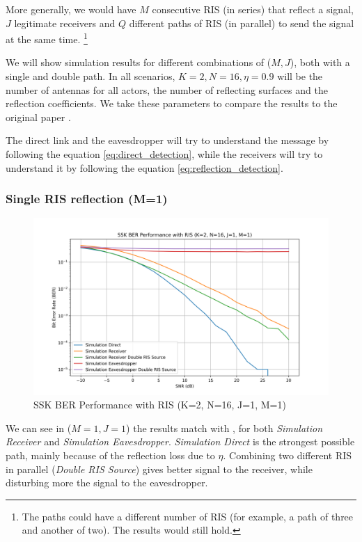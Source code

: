 More generally, we would have $M$ consecutive RIS (in series) that reflect a signal, $J$ legitimate receivers and $Q$ different paths of RIS (in parallel) to send the signal at the same time. \footnote{The paths could have a different number of RIS (for example, a path of three and another of two). The results would still hold.}

We will show simulation results for different combinations of ($M, J$), both with a single and double path. In all scenarios, $K = 2, N = 16, \eta = 0.9$ will be the number of antennas for all actors, the number of reflecting surfaces and the reflection coefficients. We take these parameters to compare the results to the original paper \cite{9328149}.

The direct link and the eavesdropper will try to understand the message by following the equation \eqref{eq:direct_detection}, while the receivers will try to understand it by following the equation \eqref{eq:reflection_detection}.

\subsubsection{Single RIS reflection (M=1)}

\begin{figure}[H]
  \centering
  \includegraphics[width=0.9\linewidth]{imgs/ber-simulations/SSK BER Performance with RIS (K=2, N=16, J=1, M=1).png}
  \caption{SSK BER Performance with RIS (K=2, N=16, J=1, M=1)}
  \label{fig:simulation_j1_m1}
\end{figure}

We can see in ($M=1, J=1$) the results match with \cite{9328149}, for both \textit{Simulation Receiver} and \textit{Simulation Eavesdropper}.
\textit{Simulation Direct} is the strongest possible path, mainly because of the reflection loss due to $\eta$.
Combining two different RIS in parallel (\textit{Double RIS Source}) gives better signal to the receiver, while disturbing more the signal to the eavesdropper.

